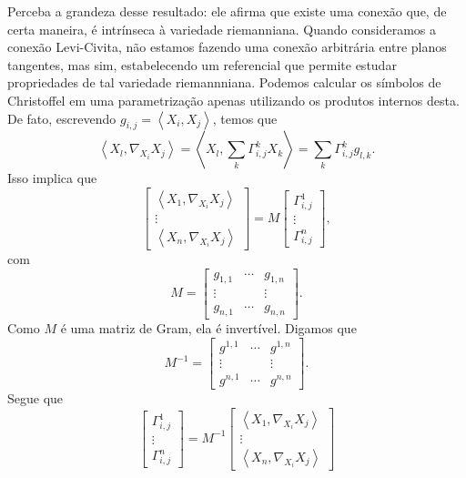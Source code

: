 Perceba a grandeza desse resultado: ele afirma que existe uma conexão que, de certa maneira, é intrínseca à variedade riemanniana. Quando consideramos a conexão Levi-Civita, não estamos fazendo uma conexão arbitrária entre planos tangentes, mas sim, estabelecendo um referencial que permite estudar propriedades de tal variedade riemannniana.
Podemos calcular os símbolos de Christoffel em uma parametrização apenas utilizando os produtos internos desta. De fato, escrevendo $g_{i,j}=\left<X_{i},X_{j}\right>$, temos que
\begin{equation*}
	\left<X_{l},\nabla_{X_{i}}X_{j}\right> = \left<X_{l},\sum_{k}\Gamma_{i,j}^{k}X_{k}\right>= \sum_{k}\Gamma_{i,j}^{k}g_{l,k}  .
\end{equation*}
Isso implica que
\begin{equation*}
	\begin{bmatrix}
		\left<X_{1},\nabla_{X_{i}}X_{j}\right> \\
		\vdots                                 \\
		\left<X_{n},\nabla_{X_{i}}X_{j}\right>
	\end{bmatrix} =
	M
	\begin{bmatrix}
		\Gamma_{i,j}^{1} \\
		\vdots           \\
		\Gamma_{i,j}^{n}
	\end{bmatrix},
\end{equation*}
com
\begin{equation*}
	M = \begin{bmatrix}
		g_{1,1} & \cdots & g_{1,n} \\
		\vdots  &        & \vdots  \\
		g_{n,1} & \cdots & g_{n,n}
	\end{bmatrix}.
\end{equation*}
Como $M$ é uma matriz de Gram, ela é invertível. Digamos que
\begin{equation*}
	M^{-1} = \begin{bmatrix}
		g^{1,1} & \cdots & g^{1,n} \\
		\vdots  &        & \vdots  \\
		g^{n,1} & \cdots & g^{n,n}
	\end{bmatrix}.
\end{equation*}
Segue que
\begin{equation*}
	\begin{bmatrix}
		\Gamma_{i,j}^{1} \\
		\vdots           \\
		\Gamma_{i,j}^{n}
	\end{bmatrix}=
	M^{-1}
	\begin{bmatrix}
		\left<X_{1},\nabla_{X_{i}}X_{j}\right> \\
		\vdots                                 \\
		\left<X_{n},\nabla_{X_{i}}X_{j}\right>
	\end{bmatrix}
\end{equation*}
